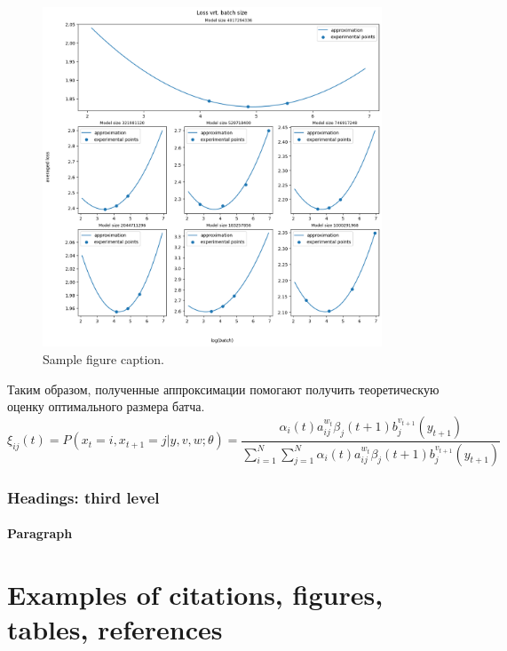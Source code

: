 \documentclass{article}
\begin{document}
\begin{figure}
	\centering
	\includegraphics[width=0.9\textwidth]{../figures/approximations.png}
	\caption{Sample figure caption.}
	\label{fig:fig1}
\end{figure}
Таким образом, полученные аппроксимации помогают получить теоретическую оценку оптимального размера батча.
\lipsum[5]
\begin{equation}
	\xi _{ij}(t)=P(x_{t}=i,x_{t+1}=j|y,v,w;\theta)= {\frac {\alpha _{i}(t)a^{w_t}_{ij}\beta _{j}(t+1)b^{v_{t+1}}_{j}(y_{t+1})}{\sum _{i=1}^{N} \sum _{j=1}^{N} \alpha _{i}(t)a^{w_t}_{ij}\beta _{j}(t+1)b^{v_{t+1}}_{j}(y_{t+1})}}
\end{equation}

\subsubsection{Headings: third level}
\lipsum[6]

\paragraph{Paragraph}
\lipsum[7]



\section{Examples of citations, figures, tables, references}
\label{sec:others}
\end{document}
